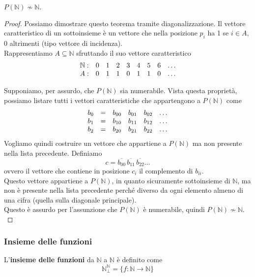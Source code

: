 \begin{theor}
	$P(\mathbb{N}) \nsim \mathbb{N}$.\\
\end{theor}
\begin{proof}
	Possiamo dimostrare questo teorema tramite diagonalizzazione. Il vettore caratteristico di un sottoinsieme è un vettore che nella posizione $p_i$ ha 1 se $i \in A$, 0 altrimenti (tipo vettore di incidenza).\\
	
	Rappresentiamo $A \subseteq \mathbb{N}$ sfruttando il suo vettore caratteristico
	$$ \begin{array}{c c c c c c c c c}
		\mathbb{N}: & 0 & 1 & 2 & 3 & 4 & 5 & 6 & \dots \\
		A: & 0 & 1 & 1 & 0 & 1 & 1 & 0 & \dots \\
	\end{array}$$
	
	Supponiamo, per assurdo, che $P (\mathbb{N})$ sia numerabile. Vista questa proprietà, possiamo listare tutti i vettori caratteristiche che appartengono a $P(\mathbb{N})$ come
	$$ 
	\begin{array}{c c c c c c}
		b_0 & = & b_{00} & b_{01} & b_{02} & \dots \\
		b_1 & = & b_{10} & b_{11} & b_{12} & \dots \\
		b_2 & = & b_{20} & b_{21} & b_{22} & \dots \\
	\end{array}
	$$
	Vogliamo quindi costruire un vettore che appartiene a $P(\mathbb{N})$ ma non presente nella lista precedente. Definiamo
	$$ c = \overline{b_{00}} \, \overline{b_{11}} \, \overline{b_{22}} \dots $$
	ovvero il vettore che contiene in posizione $c_i$ il complemento di $b_{ii}$.\\
	
	Questo vettore appartiene a $P(\mathbb{N})$, in quanto sicuramente sottoinsieme di $\mathbb{N}$, ma non è presente nella lista precedente perché diverso da ogni elemento almeno di una cifra (quella sulla diagonale principale). \\
	
	Questo è assurdo per l'assunzione che $P(\mathbb{N})$ è numerabile, quindi $P(\mathbb{N}) \nsim \mathbb{N}$.\\
\end{proof}

\subsubsection{Insieme delle funzioni}
L'\textbf{insieme delle funzioni} da $\mathbb{N}$ a $\mathbb{N}$ è definito come
$$ \mathbb{N}^{\mathbb{N}}_\bot = \{f: \mathbb{N} \rightarrow \mathbb{N} \} $$

